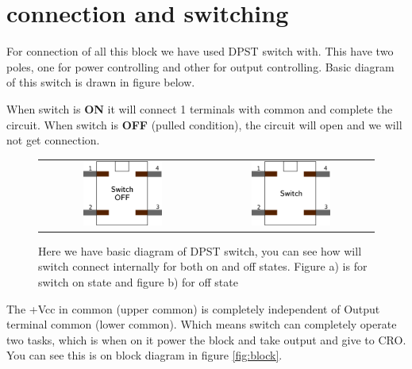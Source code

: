 \documentclass[14pt,a4paper]{extarticle}
\begin{document}
\section{connection and switching}
\label{sec:orge31cdcf}

For connection of all this block we have used DPST switch with. This have two poles, one for power controlling and other for output controlling. Basic diagram of this switch is drawn in figure below.

When switch is \textbf{\textbf{ON}} it will connect 1 terminals with common and complete the circuit. When switch is \textbf{\textbf{OFF}} (pulled condition), the circuit will open and we will not get connection.


\begin{figure}[H]
\centering
\begin{tabular}{cc}
    \includegraphics[width=0.5\textwidth]{imgs/switch.png}&
    \includegraphics[width=0.5\textwidth]{imgs/switchoff.png}
\end{tabular}
\caption{Here we have basic diagram of DPST switch, you can see how will switch connect internally for both on and off states. Figure a) is for switch on state and figure b) for off state}
\label{fig:switch}    
\end{figure}


The +Vcc in common (upper common) is completely independent of Output terminal common (lower common). Which means switch can completely operate two tasks, which is when on it power the block and take output and give to CRO. You can see this is on block diagram in figure \ref{fig:block}.
\end{document}
